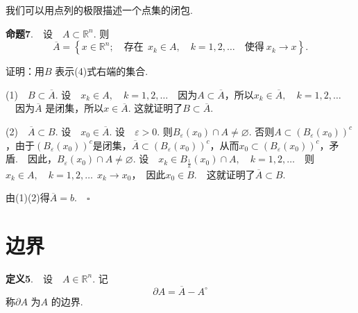 \documentclass{article}
\begin{document}
\newpage

\noindent 我们可以用点列的极限描述一个点集的闭包.

\vspace{20pt}

\noindent \textbf{命题7}.\ \ 设\ \ \(A \subset \mathbb{R}^n\). 则
\begin{equation}
    \overline{A} = \left\{x \in \mathbb{R}^n;\quad \text{存在}\ \ x_k \in A,\quad k = 1,2,\dots \quad \text{使得}\ x_k \to x \right\}.
\end{equation}

\vspace{20pt}

\noindent 证明：用\(B\) 表示(4)式右端的集合.

\vspace{10pt}

\noindent (1)\ \ \(B \subset  \overline{A}\). \newline
设\ \ \(x_k \in A,\quad k = 1,2,\dots \)\ \ 因为\(A \subset \overline{A}\)，所以\(x_k \in \overline{A},\quad k = 1,2,\dots \)\ \ 因为\(\overline{A}\) 是闭集，所以\(x \in \overline{A}\). 这就证明了\(B \subset \overline{A}\).

\vspace{10pt}


\noindent (2)\ \ \(\overline{A} \subset B\). \newline
设\ \ \(x_0 \in \overline{A}\). 设\ \ \(\varepsilon > 0\). 则\(B_{\varepsilon }(x_0)\cap A \neq \varnothing \). 否则\(A \subset \left( B_{\varepsilon }(x_0) \right)^{c} \)，由于\(\left( B_{\varepsilon }(x_0) \right)^{c}\)是闭集，\(\overline{A} \subset \left( B_{\varepsilon }(x_0) \right)^{c}\)，从而\(x_0 \subset \left(B_{\varepsilon }(x_0)\right)^{c}\)，矛盾.\ \ 因此，\(B_{\varepsilon }(x_0)\cap A \neq \varnothing \). 设\ \ \(x_k \in B_{\frac{1}{k} }(x_0)\cap A,\quad k = 1,2,\dots \)\ \ 则\(x_k \in A,\quad k = 1,2,\dots\ \ x_k \to x_0\)，\ 因此\(x_0 \in B\).\ \ 这就证明了\(\overline{A} \subset B\).

\vspace{20pt}

\noindent 由(1)(2)得\(\overline{A} = b. \quad \square\)

\newpage

\section{边界}
\noindent \textbf{定义5}.\ \ 设\ \ \(A \in \mathbb{R}^n\). 记
\begin{equation*}
    \partial A = \overline{A} - A^{\circ }
\end{equation*}
称\(\partial A\) 为\(A\) 的边界.
\end{document}
